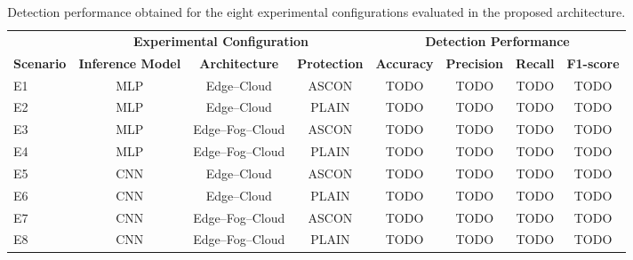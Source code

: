 \documentclass[journal,article,submit,moreauthors]{Definitions/mdpi}
\begin{document}
\begin{table}[ht]
\centering
\caption{Detection performance obtained for the eight experimental configurations evaluated in the proposed architecture.}
\label{tab:detection_capability}
\footnotesize
\begin{tabular}{lccccccc}
\toprule
&
\multicolumn{3}{c}{\textbf{Experimental Configuration}}
&
\multicolumn{4}{c}{\textbf{Detection Performance}}
\\
\cmidrule(lr){2-4}
\cmidrule(lr){5-8}
\textbf{Scenario} &
\textbf{Inference Model} &
\textbf{Architecture} &
\textbf{Protection} &
\textbf{Accuracy} &
\textbf{Precision} &
\textbf{Recall} &
\textbf{F1-score}
\\
\midrule
E1 & MLP & Edge--Cloud      & ASCON & TODO & TODO & TODO & TODO \\
E2 & MLP & Edge--Cloud      & PLAIN & TODO & TODO & TODO & TODO \\
E3 & MLP & Edge--Fog--Cloud & ASCON & TODO & TODO & TODO & TODO \\
E4 & MLP & Edge--Fog--Cloud & PLAIN & TODO & TODO & TODO & TODO \\
E5 & CNN & Edge--Cloud      & ASCON & TODO & TODO & TODO & TODO \\
E6 & CNN & Edge--Cloud      & PLAIN & TODO & TODO & TODO & TODO \\
E7 & CNN & Edge--Fog--Cloud & ASCON & TODO & TODO & TODO & TODO \\
E8 & CNN & Edge--Fog--Cloud & PLAIN & TODO & TODO & TODO & TODO \\
\bottomrule
\end{tabular}
\end{table}
\end{document}
